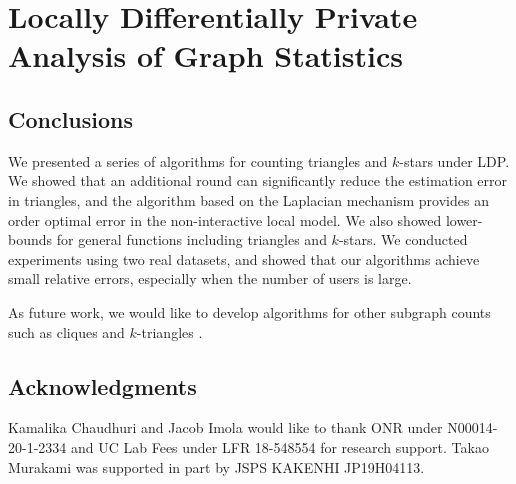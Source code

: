 \graphicspath{{./chapters/chapter1}}

\chapter{Locally Differentially Private Analysis of Graph Statistics}\label{chap:1}






% 


\section{Conclusions}
\label{chap1-sec:conclusions}
We presented a series of algorithms for counting triangles and $k$-stars under LDP. 
We 
showed that an additional round can significantly reduce the estimation error in triangles, and the algorithm based on the Laplacian mechanism provides an order optimal error in the non-interactive local model. 
We also showed lower-bounds for general functions including triangles and $k$-stars. 
We conducted experiments using two real datasets, and showed that our algorithms achieve small relative errors, especially when the number of users is large.

As future work, we would like to develop algorithms for other subgraph counts such as cliques and $k$-triangles \cite{Karwa_PVLDB11}. 

\section*{Acknowledgments}
Kamalika Chaudhuri and Jacob Imola would like to thank ONR under N00014-20-1-2334 and UC Lab Fees under LFR 18-548554  for research support. 
Takao Murakami was supported in part by JSPS KAKENHI JP19H04113.


